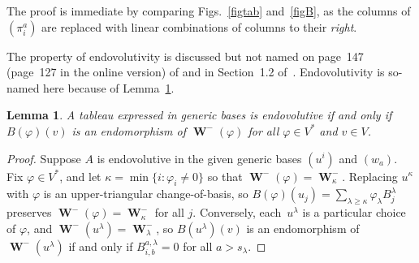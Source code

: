 \documentclass[pdftex]{sigma}
\numberwithin{equation}{section}
\newtheorem{Lemma}[Theorem]{Lemma}
{\theoremstyle{definition}
\newtheorem{Definition}[Theorem]{Definition} }
\DeclareMathOperator{\Wu}{\mathbf{W}}
\begin{document}
The proof is immediate by comparing Figs.~\ref{figtab} and~\ref{figB}, as
the columns of $(\pi^a_i)$ are replaced with linear combinations of columns to
their \emph{right}.

The property of endovolutivity is discussed but not named on page~147 (page~127 in
the online version) of \cite{BCGGG} and in Section~1.2 of~\cite{Yang1987}.
Endovolutivity is so-named here because of Lemma~\ref{lem:endolemma}.

\begin{Lemma}\label{lem:endolemma}
A tableau expressed in generic bases is endovolutive if and only if
$B(\varphi)(v)$ is an endomorphism of $\Wu^-(\varphi)$ for all
$\varphi \in V^*$ and $v \in V$.
\end{Lemma}

\begin{proof}
Suppose $A$ is endovolutive in the given generic bases $(u^i)$ and $(w_a)$.
Fix $\varphi \in V^*$, and let $\kappa = \min
\{ i\colon \varphi_i \neq 0\}$ so that $\Wu^-(\varphi) = \Wu^-_\kappa$.
Replacing $u^\kappa$ with $\varphi$ is an upper-triangular
change-of-basis, so $B(\varphi)(u_j) = \sum\limits_{\lambda \geq \kappa} \varphi_\lambda B^\lambda_j$
preserves $\Wu^-(\varphi)=\Wu^-_{\kappa}$ for all $j$.
Conversely, each~$u^\lambda$ is a particular
choice of $\varphi$, and $\Wu^-(u^\lambda) = \Wu^-_\lambda$, so
$B(u^\lambda)(v)$ is an endomorphism of $\Wu^-(u^\lambda)$ if and only if
$B^{a,\lambda}_{i,b}=0$ for all $a > s_\lambda$.
\end{proof}
\end{document}
